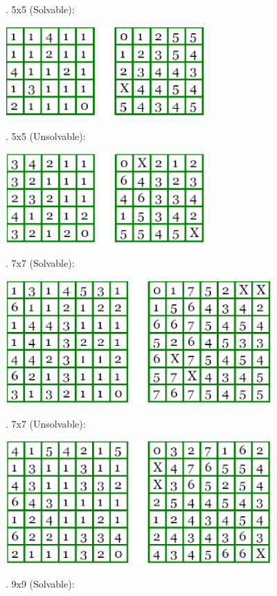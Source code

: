 \documentclass[12pt, letterpaper]{article}
\begin{document}
\medskip
{}. 5x5 (Solvable):
	
\includegraphics[width=3in]{"Task 2/5x5 Puzzle (Solvable)"}

\bigskip
{}. 5x5 (Unsolvable):

\includegraphics[width=3in]{"Task 2/5x5 Puzzle (Unsolvable)"}

\bigskip
{}. 7x7 (Solvable):

\includegraphics[width=4in, keepaspectratio]{"Task 2/7x7 Puzzle (Solvable)"}

\bigskip	
{}. 7x7 (Unsolvable):

\includegraphics[width=4in, keepaspectratio]{"Task 2/7x7 Puzzle (Unsolvable)"}

\bigskip	
{}. 9x9 (Solvable):
	
\end{document}
